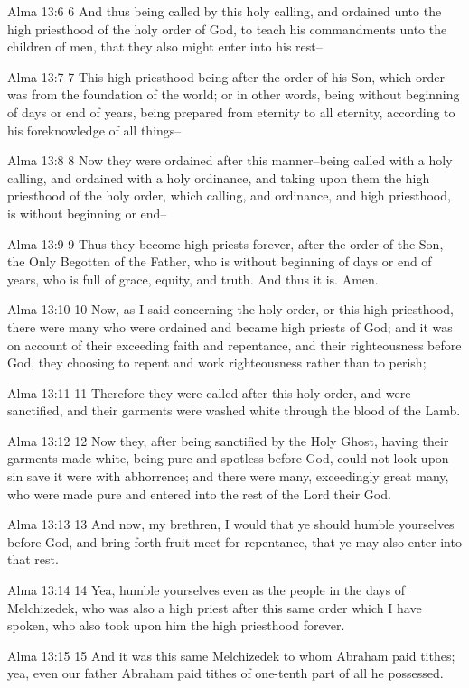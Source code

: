 Alma 13:6
 6 And thus being called by this holy calling, and ordained unto
the high priesthood of the holy order of God, to teach his
commandments unto the children of men, that they also might enter
into his rest--

Alma 13:7
 7 This high priesthood being after the order of his Son, which
order was from the foundation of the world; or in other words,
being without beginning of days or end of years, being prepared
from eternity to all eternity, according to his foreknowledge of
all things--

Alma 13:8
 8 Now they were ordained after this manner--being called with a
holy calling, and ordained with a holy ordinance, and taking upon
them the high priesthood of the holy order, which calling, and
ordinance, and high priesthood, is without beginning or end--

Alma 13:9
 9 Thus they become high priests forever, after the order of the
Son, the Only Begotten of the Father, who is without beginning of
days or end of years, who is full of grace, equity, and truth.
And thus it is. Amen.

Alma 13:10
 10 Now, as I said concerning the holy order, or this high
priesthood, there were many who were ordained and became high
priests of God; and it was on account of their exceeding faith
and repentance, and their righteousness before God, they choosing
to repent and work righteousness rather than to perish;

Alma 13:11
 11 Therefore they were called after this holy order, and were
sanctified, and their garments were washed white through the
blood of the Lamb.

Alma 13:12
 12 Now they, after being sanctified by the Holy Ghost, having
their garments made white, being pure and spotless before God,
could not look upon sin save it were with abhorrence; and there
were many, exceedingly great many, who were made pure and entered
into the rest of the Lord their God.

Alma 13:13
 13 And now, my brethren, I would that ye should humble
yourselves before God, and bring forth fruit meet for repentance,
that ye may also enter into that rest.

Alma 13:14
 14 Yea, humble yourselves even as the people in the days of
Melchizedek, who was also a high priest after this same order
which I have spoken, who also took upon him the high priesthood
forever.

Alma 13:15
 15 And it was this same Melchizedek to whom Abraham paid tithes;
yea, even our father Abraham paid tithes of one-tenth part of all
he possessed.

